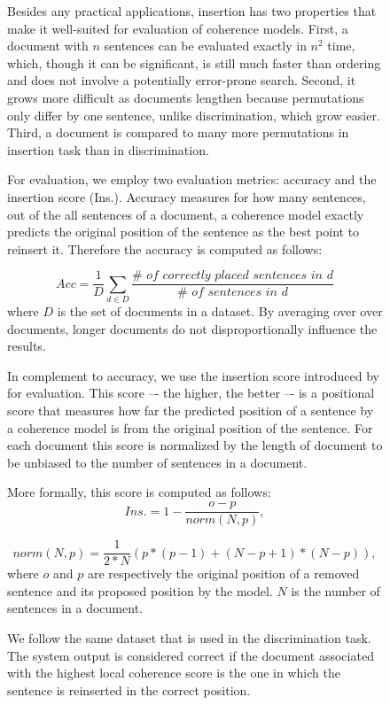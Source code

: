 \begin{figure}[!t]
Besides any practical applications, insertion has two properties that make it well-suited for evaluation of coherence models. 
First, a document with $n$ sentences can be evaluated exactly in $n^2$ time, which, though it can be significant, is
still much faster than ordering and does not involve a potentially error-prone search.
Second, it grows more difficult as documents lengthen because permutations only differ by one sentence, unlike discrimination, which grow easier. 
Third, a document is compared to many more permutations in insertion task than in discrimination. 


For evaluation, we employ two evaluation metrics: accuracy and the insertion score (Ins.). 
Accuracy measures for how many sentences, out of the all sentences of a document, a coherence model exactly predicts the original position of the sentence as the best point to reinsert it. 
Therefore the accuracy is computed as follows:

\begin{equation}
Acc = \frac{1}{D}\sum_{d \in D}\frac{\#\textit{ of correctly placed sentences in d}}{\#\textit{ of sentences in d}}
\end{equation}
%
where $D$ is the set of documents in a dataset.  
By averaging over over documents, longer documents do not disproportionally influence the results. 

In complement to accuracy, we use the insertion score introduced by 
 for evaluation. 
This score  –- the higher, the better –-  is a positional score that measures how far the predicted position of a sentence by a coherence model is from the original position of the sentence. 
For each document this score is normalized by the length of document to be unbiased to the number of sentences in a document. 

More formally, this score is computed as follows:
\begin{equation}
Ins. = 1 - \frac{o - p}{norm(N, p)},
\end{equation}


\begin{equation}
norm(N, p) = \frac{1}{2*N} (p * (p-1) + (N - p + 1)*(N - p)),
\end{equation}
%
where $o$ and $p$ are respectively the original position of a removed sentence and its proposed position by the model. 
$N$ is the number of sentences in a document.  

We follow the same dataset that is used in the discrimination task.  
The system output is considered correct if the document associated with the highest local coherence score is
the one in which the sentence is reinserted in the correct position. 


\end{figure}
